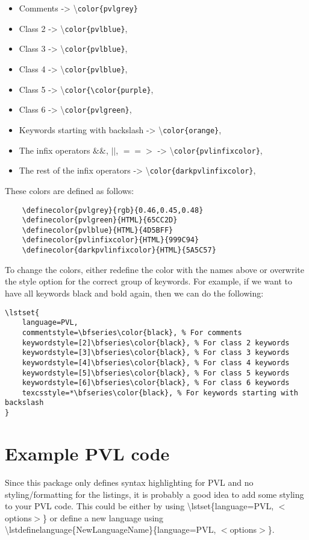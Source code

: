 \documentclass[a4paper]{scrartcl}
\begin{document}
\begin{itemize}
	\setlength\itemsep{0cm}
	\item Comments -> \textbackslash \verb|color{pvlgrey}|
	\item Class 2 -> \textbackslash \verb|color{pvlblue}|,
	\item Class 3 -> \textbackslash \verb|color{pvlblue}|,
	\item Class 4 -> \textbackslash \verb|color{pvlblue}|,
	\item Class 5 -> \textbackslash \verb|color{\color{purple}|,
	\item Class 6 -> \textbackslash \verb|color{pvlgreen}|,
	\item Keywords starting with backslash -> \textbackslash \verb|color{orange}|,
	\item The infix operators $\&\&$, $||$, $==>$ -> \textbackslash \verb|color{pvlinfixcolor}|,
	\item The rest of the infix operators -> \textbackslash \verb|color{darkpvlinfixcolor}|,
\end{itemize}

\noindent These colors are defined as follows:

\begin{verbatim}
    \definecolor{pvlgrey}{rgb}{0.46,0.45,0.48}
    \definecolor{pvlgreen}{HTML}{65CC2D}
    \definecolor{pvlblue}{HTML}{4D5BFF}
    \definecolor{pvlinfixcolor}{HTML}{999C94}
    \definecolor{darkpvlinfixcolor}{HTML}{5A5C57}
\end{verbatim}

\noindent To change the colors, either redefine the color with the names above or overwrite the style option for the correct group of keywords. For example, if we want to have all keywords black and bold again, then we can do the following:

\begin{verbatim}
\lstset{
    language=PVL,
    commentstyle=\bfseries\color{black}, % For comments
    keywordstyle=[2]\bfseries\color{black}, % For class 2 keywords
    keywordstyle=[3]\bfseries\color{black}, % For class 3 keywords
    keywordstyle=[4]\bfseries\color{black}, % For class 4 keywords
    keywordstyle=[5]\bfseries\color{black}, % For class 5 keywords
    keywordstyle=[6]\bfseries\color{black}, % For class 6 keywords
    texcsstyle=*\bfseries\color{black}, % For keywords starting with backslash
}
\end{verbatim}

\section{Example PVL code}
Since this package only defines syntax highlighting for PVL and no styling/formatting for the listings, it is probably a good idea to add some styling to your PVL code. This could be either by using \textbackslash lstset\{language=PVL, $<$options$>$\} or define a new language using \textbackslash lstdefinelanguage\{NewLanguageName\}\{language=PVL, $<$options$>$\}.
\end{document}
